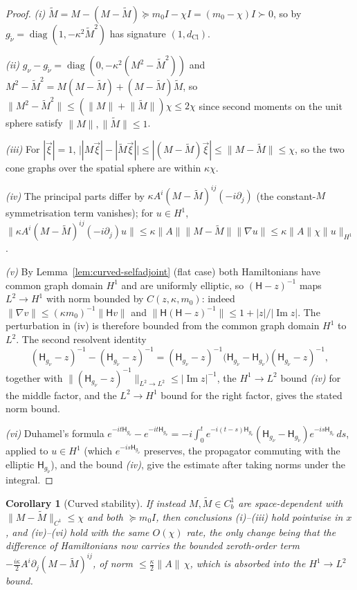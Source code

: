 \documentclass[11pt]{article}
\newtheorem{corollary}[theorem]{Corollary}
\theoremstyle{definition}
\theoremstyle{remark}
\newcommand{\dCl}{d_{\mathrm{Cl}}}
\newcommand{\diag}{\operatorname{diag}}
\newcommand{\Ham}{\mathsf{H}}
\newcommand{\norm}[1]{\lVert#1\rVert}
\begin{document}
\begin{proof}
\emph{(i)} $\tilde M=M-(M-\tilde M)\succeq m_0 I-\chi I=(m_0-\chi)I\succ0$, so by
 $g_{\tilde\nu}=\diag(1,-\kappa^2\tilde M^2)$ has
signature $(1,\dCl)$.

\emph{(ii)} $g_\nu-g_{\tilde\nu}=\diag(0,-\kappa^2(M^2-\tilde M^2))$ and
$M^2-\tilde M^2=M(M-\tilde M)+(M-\tilde M)\tilde M$, so
$\norm{M^2-\tilde M^2}\le(\norm{M}+\norm{\tilde M})\chi\le2\chi$ since second
moments on the unit sphere satisfy $\norm{M},\norm{\tilde M}\le1$.

\emph{(iii)} For $|\vec\xi|=1$,
$\bigl||M\vec\xi|-|\tilde M\vec\xi|\bigr|\le|(M-\tilde M)\vec\xi|
\le\norm{M-\tilde M}\le\chi$, so the two cone graphs over the spatial sphere are
within $\kappa\chi$.

\emph{(iv)} The principal parts differ by $\kappa A^i(M-\tilde M)^{ij}
(-i\partial_j)$ (the constant-$M$ symmetrisation term vanishes); for $u\in H^1$,
$\norm{\kappa A^i(M-\tilde M)^{ij}(-i\partial_j)u}\le\kappa\norm{A}\norm{M-\tilde
M}\norm{\nabla u}\le\kappa\norm{A}\chi\norm{u}_{H^1}$.

\emph{(v)} By Lemma~\ref{lem:curved-selfadjoint} (flat case) both Hamiltonians have
common graph domain $H^1$ and are uniformly elliptic, so $(\Ham-z)^{-1}$ maps
$L^2\to H^1$ with norm bounded by $C(z,\kappa,m_0)$: indeed
$\norm{\nabla v}\le(\kappa m_0)^{-1}\norm{\Ham v}$ and
$\norm{\Ham(\Ham-z)^{-1}}\le1+|z|/|\!\operatorname{Im}z|$.  The perturbation in
(iv) is therefore bounded from the common graph domain $H^1$ to $L^2$.  The second resolvent
identity
\[
  (\Ham_{g_\nu}-z)^{-1}-(\Ham_{g_{\tilde\nu}}-z)^{-1}
  =(\Ham_{g_\nu}-z)^{-1}\bigl(\Ham_{g_{\tilde\nu}}-\Ham_{g_\nu}\bigr)
   (\Ham_{g_{\tilde\nu}}-z)^{-1},
\]
together with $\norm{(\Ham_{g_\nu}-z)^{-1}}_{L^2\to L^2}\le|\!\operatorname{Im}
z|^{-1}$, the $H^1\!\to\!L^2$ bound \emph{(iv)} for the middle factor, and the
$L^2\!\to\!H^1$ bound for the right factor, gives the stated norm bound.

\emph{(vi)} Duhamel's formula
$e^{-it\Ham_{g_\nu}}-e^{-it\Ham_{g_{\tilde\nu}}}
=-i\int_0^t e^{-i(t-s)\Ham_{g_\nu}}(\Ham_{g_\nu}-\Ham_{g_{\tilde\nu}})
e^{-is\Ham_{g_{\tilde\nu}}}\,ds$, applied to $u\in H^1$ (which $e^{-is
\Ham_{g_{\tilde\nu}}}$ preserves, the propagator commuting with the elliptic
$\Ham_{g_{\tilde\nu}}$), and the bound \emph{(iv)}, give the estimate after
taking norms under the integral.
\end{proof}

\begin{corollary}[Curved stability]
\label{cor:curved-stability}
If instead $M,\tilde M\in C^1_b$ are space-dependent with
$\norm{M-\tilde M}_{C^1}\le\chi$ and both $\succeq m_0 I$, then conclusions
\textup{(i)--(iii)} hold pointwise in $x$, and \textup{(iv)--(vi)} hold with the
same $O(\chi)$ rate, the only change being that the difference of Hamiltonians
now carries the bounded zeroth-order term
$-\tfrac{i\kappa}{2}A^i\partial_j(M-\tilde M)^{ij}$, of norm $\le
\tfrac{\kappa}{2}\norm{A}\,\chi$, which is absorbed into the $H^1\to L^2$ bound.
\end{corollary}
\end{document}
